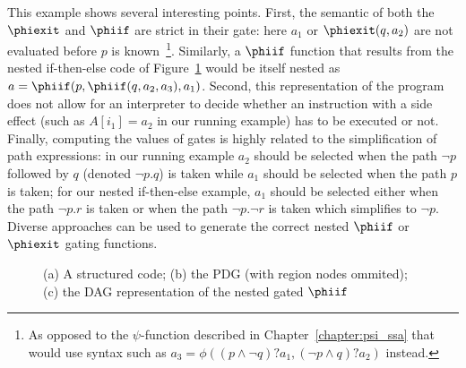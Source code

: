 This example shows several interesting points. 
First, the semantic of both the $\phiexit$ and $\phiif$ are strict in their gate: 
here $a_1$ or $\phiexit(q,a_2)$ are not evaluated before $p$ is known~\footnote{As opposed to the $\psi$-function described in Chapter~\ref{chapter:psi_ssa} that would use syntax such as $a_3=\phi((p\wedge \lnot q)?a_1, (\lnot p\wedge q)?a_2)$ instead.}. 
Similarly, a $\phiif$ function that results from the nested if-then-else code of Figure~\ref{fig:vsdg:structured} would be itself nested as $a=\phiif(p,\phiif(q,a_2,a_3),a_1)$. 
Second, this representation of the program does not allow for an interpreter to decide whether an instruction with a side effect (such as $A[i_1]=a_2$ in our running example) has to be executed or not. 
Finally, computing the values of gates is highly related to the simplification of path expressions: 
in our running example $a_2$ should be selected when the path $\lnot p$ followed by $q$ (denoted $\lnot p . 
q$) is taken while $a_1$ should be selected when the path $p$ is taken; 
for our nested if-then-else example, $a_1$ should be selected either when the path $\lnot p . 
r$ is taken or when the path $\lnot p . 
\lnot r$ is taken which simplifies to $\lnot p$. 
Diverse approaches can be used to generate the correct nested $\phiif$ or $\phiexit$ gating functions.

\begin{figure}
\caption{(a) A structured code; (b) the PDG (with region nodes ommited); (c) the DAG representation of the nested gated $\phiif$ \label{fig:vsdg:structured}}
\end{figure}

